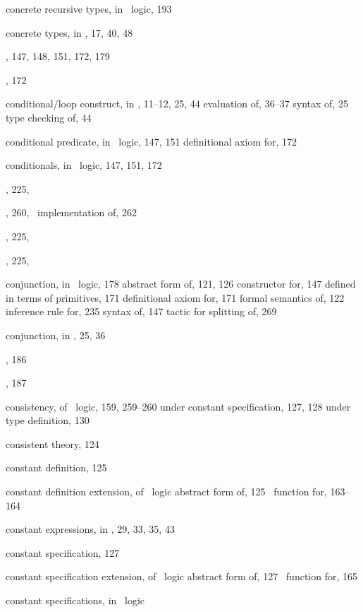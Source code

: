 \begin{theindex}
  \item concrete recursive types, in \HOL\ logic, 193
  \item concrete types, in \ML, 17, 40, 48
  \item {}, 147, 148, 151, 172, 179
  \item {}, 172
  \item conditional/loop construct, in \ML, 11--12, 25, 44
    \subitem evaluation of, 36--37
    \subitem syntax of, 25
    \subitem type checking of, 44
  \item conditional predicate, in \HOL\ logic, 147, 151
    \subitem definitional axiom for, 172
  \item conditionals, in \HOL\ logic, 147, 151, 172
  \item {}, 225, 
  \item {}, 260, 
    \subitem \ML\ implementation of, 262
  \item {}, 225, 
  \item {}, 225, 
  \item conjunction, in \HOL\ logic, 178
    \subitem abstract form of, 121, 126
    \subitem constructor for, 147
    \subitem defined in terms of primitives, 171
    \subitem definitional axiom for, 171
    \subitem formal semantics of, 122
    \subitem inference rule for, 235
    \subitem syntax of, 147
    \subitem tactic for splitting of, 269
  \item conjunction, in \ML, 25, 36
  \item {}, 186
  \item {}, 187
  \item consistency, of \HOL\ logic, 159, 259--260
    \subitem under constant specification, 127, 128
    \subitem under type definition, 130
  \item consistent theory, 124
  \item constant definition, 125
  \item constant definition extension, of \HOL\ logic
    \subitem abstract form of, 125
    \subitem \ML\ function for, 163--164
  \item constant expressions, in \ML, 29, 33, 35, 43
  \item constant specification, 127
  \item constant specification extension, of \HOL\ logic
    \subitem abstract form of, 127
    \subitem \ML\ function for, 165
  \item constant specifications, in \HOL\ logic

\end{theindex}
